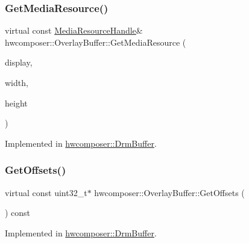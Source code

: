 \subsubsection{\texorpdfstring{Get\+Media\+Resource()}{GetMediaResource()}}
{\footnotesize\ttfamily virtual const \mbox{\hyperlink{namespacehwcomposer_aa99e35835961ac7d6baa59a04131ff42}{Media\+Resource\+Handle}}\& hwcomposer\+::\+Overlay\+Buffer\+::\+Get\+Media\+Resource (\begin{DoxyParamCaption}\item[{\mbox{\hyperlink{namespacehwcomposer_a10d64930907cc775f9cea6b39d8cb404}{Media\+Display}}}]{display,  }\item[{uint32\+\_\+t}]{width,  }\item[{uint32\+\_\+t}]{height }\end{DoxyParamCaption})\hspace{0.3cm}{\ttfamily [pure virtual]}}



Implemented in \mbox{\hyperlink{classhwcomposer_1_1DrmBuffer_a816ad1d2e1f7698eba57d58096b532dc}{hwcomposer\+::\+Drm\+Buffer}}.

\mbox{\label{classhwcomposer_1_1OverlayBuffer_ab2ebf4c92de3d7ad57f108871fa58d24}} 
\subsubsection{\texorpdfstring{Get\+Offsets()}{GetOffsets()}}
{\footnotesize\ttfamily virtual const uint32\+\_\+t$\ast$ hwcomposer\+::\+Overlay\+Buffer\+::\+Get\+Offsets (\begin{DoxyParamCaption}{ }\end{DoxyParamCaption}) const\hspace{0.3cm}{\ttfamily [pure virtual]}}



Implemented in \mbox{\hyperlink{classhwcomposer_1_1DrmBuffer_a4545b534f1266e287d351ddb6fc2e2db}{hwcomposer\+::\+Drm\+Buffer}}.

\mbox{\label{classhwcomposer_1_1OverlayBuffer_a29ba52c586290b087991e195212c53f2}} 
